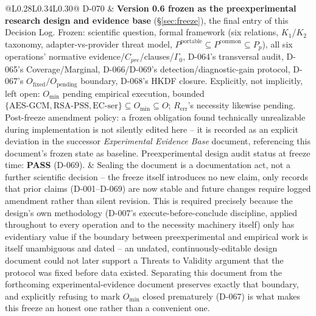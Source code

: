 \documentclass[11pt,a4paper]{article}
\begin{document}
\begin{longtable}{@{}L{0.28\textwidth}L{0.34\textwidth}L{0.30\textwidth}@{}}
D-070 & \textbf{Version 0.6 frozen as the preexperimental research design and evidence base} (\S\ref{sec:freeze}), the final entry of this Decision Log. Frozen: scientific question, formal framework (six relations, $K_1$/$K_2$ taxonomy, adapter-vs-provider threat model, $P^{\text{portable}}\subseteq P^{\text{common}}\subseteq P_p$), all six operations' normative evidence/$C_{pre}$/clauses/$\Gamma_0$, D-064's transversal audit, D-065's Coverage/Marginal, D-066/D-069's detection/diagnostic-gain protocol, D-067's $O_{\text{fixed}}/O_{\text{pending}}$ boundary, D-068's HKDF closure. Explicitly, not implicitly, left open: $O_{\min}$ pending empirical execution, bounded $\{\text{AES-GCM},\text{RSA-PSS},\text{EC-ser}\}\subseteq O_{\min}\subseteq O$; $R_{\text{err}}$'s necessity likewise pending. Post-freeze amendment policy: a frozen obligation found technically unrealizable during implementation is not silently edited here -- it is recorded as an explicit deviation in the successor \emph{Experimental Evidence Base} document, referencing this document's frozen state as baseline. Preexperimental design audit status at freeze time: \textbf{PASS} (D-069). & Sealing the document is a documentation act, not a further scientific decision -- the freeze itself introduces no new claim, only records that prior claims (D-001--D-069) are now stable and future changes require logged amendment rather than silent revision. This is required precisely because the design's own methodology (D-007's execute-before-conclude discipline, applied throughout to every operation and to the necessity machinery itself) only has evidentiary value if the boundary between preexperimental and empirical work is itself unambiguous and dated -- an undated, continuously-editable design document could not later support a Threats to Validity argument that the protocol was fixed before data existed. Separating this document from the forthcoming experimental-evidence document preserves exactly that boundary, and explicitly refusing to mark $O_{\min}$ closed prematurely (D-067) is what makes this freeze an honest one rather than a convenient one.\\
\bottomrule
\end{longtable}
\end{document}

